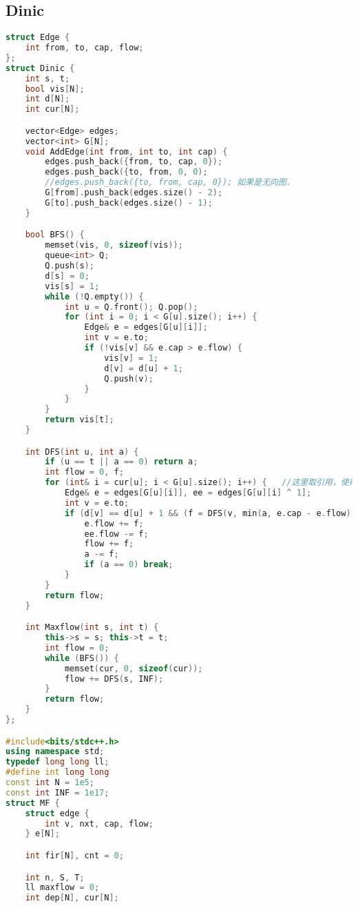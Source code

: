 \subsection{Dinic}
\begin{lstlisting}[language = c++] 
struct Edge {
    int from, to, cap, flow;
};
struct Dinic {
    int s, t;
    bool vis[N];
    int d[N];
    int cur[N];

    vector<Edge> edges;
    vector<int> G[N];
    void AddEdge(int from, int to, int cap) {
        edges.push_back({from, to, cap, 0});
        edges.push_back({to, from, 0, 0); 
        //edges.push_back({to, from, cap, 0}); 如果是无向图.
        G[from].push_back(edges.size() - 2);
        G[to].push_back(edges.size() - 1);
    }

    bool BFS() {
        memset(vis, 0, sizeof(vis));
        queue<int> Q;
        Q.push(s);
        d[s] = 0;
        vis[s] = 1;
        while (!Q.empty()) {
            int u = Q.front(); Q.pop();
            for (int i = 0; i < G[u].size(); i++) {
                Edge& e = edges[G[u][i]];
                int v = e.to;
                if (!vis[v] && e.cap > e.flow) {
                    vis[v] = 1;
                    d[v] = d[u] + 1;
                    Q.push(v);
                }
            }
        }
        return vis[t];
    }

    int DFS(int u, int a) {
        if (u == t || a == 0) return a;
        int flow = 0, f;
        for (int& i = cur[u]; i < G[u].size(); i++) {   //这里取引用，使得u的当前弧被i改变，再次访问到u时，将跳过u已经访问过的支路
            Edge& e = edges[G[u][i]], ee = edges[G[u][i] ^ 1];
            int v = e.to;
            if (d[v] == d[u] + 1 && (f = DFS(v, min(a, e.cap - e.flow))) > 0) {
                e.flow += f;
                ee.flow -= f;
                flow += f;
                a -= f;
                if (a == 0) break;
            }
        }
        return flow;
    }

    int Maxflow(int s, int t) {
        this->s = s; this->t = t;
        int flow = 0;
        while (BFS()) {
            memset(cur, 0, sizeof(cur));
            flow += DFS(s, INF);
        }
        return flow;
    }
};

#include<bits/stdc++.h>
using namespace std;
typedef long long ll;
#define int long long
const int N = 1e5;
const int INF = 1e17;
struct MF {
    struct edge {
        int v, nxt, cap, flow;
    } e[N];

    int fir[N], cnt = 0;

    int n, S, T;
    ll maxflow = 0;
    int dep[N], cur[N];


\end{lstlisting}
